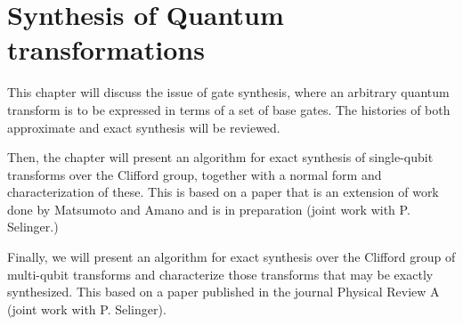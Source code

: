 \section*{Synthesis of Quantum transformations}
This chapter will discuss the issue of gate synthesis, where an arbitrary quantum transform is to
be expressed in terms of a set of base gates. The histories of both approximate and exact synthesis
will be reviewed.

Then, the chapter will present an algorithm for exact synthesis of single-qubit transforms over the
Clifford group, together with a normal form and characterization of these. This is based on a paper
that is an extension of work done by Matsumoto and Amano and is in preparation (joint work with P.
Selinger.)

Finally, we will present an algorithm for exact synthesis over the Clifford group of multi-qubit
transforms and characterize those transforms that may be exactly synthesized. This based on a paper
published in the journal Physical Review A (joint work with P. Selinger).

